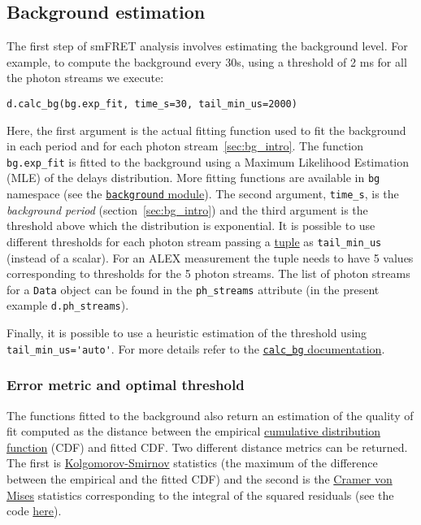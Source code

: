 \subsection{Background estimation}
\label{sec:bg_calc}

The first step of smFRET analysis involves estimating the background level. For example, to compute the background every 30s, using a threshold of 2 ms for all the photon streams we execute: 

\begin{verbatim}
d.calc_bg(bg.exp_fit, time_s=30, tail_min_us=2000)
\end{verbatim}

Here, the first argument is the actual fitting function used to fit the
background in each period and for each photon stream~\ref{sec:bg_intro}. The function 
\verb|bg.exp_fit| is fitted to the background using a Maximum Likelihood Estimation 
(MLE) of the delays distribution. More fitting functions are available in 
\verb|bg| namespace (see the 
\href{http://fretbursts.readthedocs.org/en/latest/background.html}
{\texttt{background} module}). The second argument, \verb|time_s|, is the 
\textit{background period} (section~\ref{sec:bg_intro}) and the third argument is the threshold above which the distribution is exponential. 
It is possible to use different thresholds 
for each photon stream passing a \href{https://docs.python.org/2/tutorial/datastructures.html#tuples-and-sequences}{tuple} as \verb|tail_min_us| (instead 
of a scalar). For an ALEX measurement the tuple needs to have 5 values 
corresponding to thresholds for the 5 photon streams. The list of photon 
streams for a \verb|Data| object can be found in the \verb|ph_streams| 
attribute (in the present example \verb|d.ph_streams|). 

Finally, it is 
possible to use a heuristic estimation of the threshold using 
\verb|tail_min_us='auto'|. For more details refer to the 
\href{http://fretbursts.readthedocs.org/en/latest/data_class.html#fretbursts.burstlib.Data.calc_bg}{\texttt{calc\_bg} documentation}.

\subsubsection{Error metric and optimal threshold}

The functions fitted to the background also return an estimation of the quality of fit computed as the distance between the empirical \href{http://en.wikipedia.org/wiki/Cumulative_distribution_function}{cumulative distribution function} (CDF) and fitted CDF. Two different distance metrics can be returned. The first is  
\href{http://en.wikipedia.org/wiki/Kolmogorov\%E2\%80\%93Smirnov_test}{Kolgomorov-Smirnov} statistics (the maximum of the difference between the empirical and the fitted CDF) and the second is the \href{http://en.wikipedia.org/wiki/Cram\%C3\%A9r\%E2\%80\%93von_Mises_criterion}{Cramer von Mises} statistics corresponding to the integral of the squared residuals (see the code \href{https://github.com/tritemio/FRETBursts/blob/master/fretbursts/background.py#L40}{here}).

